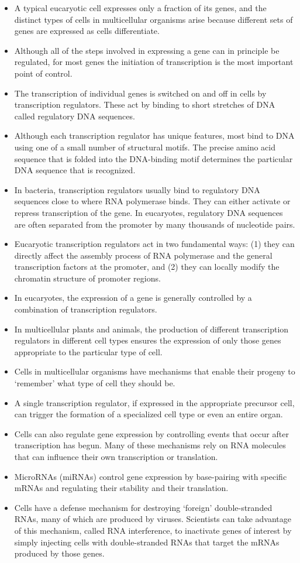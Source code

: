 \begin{itemize}
\item A typical eucaryotic cell expresses only a fraction of its genes, and
the distinct types of cells in multicellular organisms arise because
different sets of genes are expressed as cells differentiate.
\item Although all of the steps involved in expressing a gene can in principle 
be regulated, for most genes the initiation of transcription is the
most important point of control.
\item The transcription of individual genes is switched on and off in cells
by transcription regulators. These act by binding to short stretches of
DNA called regulatory DNA sequences.
\item Although each transcription regulator has unique features, most bind
to DNA using one of a small number of structural motifs. The precise
amino acid sequence that is folded into the DNA-binding motif determines 
the particular DNA sequence that is recognized.
\item In bacteria, transcription regulators usually bind to regulatory DNA
sequences close to where RNA polymerase binds. They can either
activate or repress transcription of the gene. In eucaryotes, regulatory 
DNA sequences are often separated from the promoter by many
thousands of nucleotide pairs.
\item Eucaryotic transcription regulators act in two fundamental ways:
(1) they can directly affect the assembly process of RNA polymerase
and the general transcription factors at the promoter, and (2) they
can locally modify the chromatin structure of promoter regions.
\item In eucaryotes, the expression of a gene is generally controlled by a
combination of transcription regulators.
\item In multicellular plants and animals, the production of different transcription 
regulators in different cell types ensures the expression of
only those genes appropriate to the particular type of cell.
\item Cells in multicellular organisms have mechanisms that enable their
progeny to ‘remember’ what type of cell they should be.
\item A single transcription regulator, if expressed in the appropriate precursor 
cell, can trigger the formation of a specialized cell type or
even an entire organ.
\item Cells can also regulate gene expression by controlling events that
occur after transcription has begun. Many of these mechanisms
rely on RNA molecules that can influence their own transcription or
translation.
\item MicroRNAs (miRNAs) control gene expression by base-pairing with
specific mRNAs and regulating their stability and their translation.
\item Cells have a defense mechanism for destroying ‘foreign’ double-stranded 
RNAs, many of which are produced by viruses. Scientists
can take advantage of this mechanism, called RNA interference, to
inactivate genes of interest by simply injecting cells with double-stranded 
RNAs that target the mRNAs produced by those genes.
\end{itemize}
